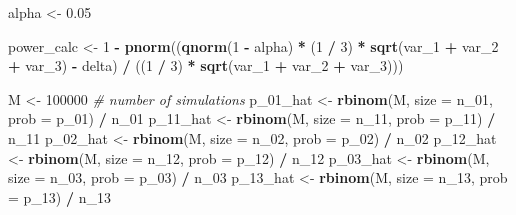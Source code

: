 \documentclass[
]{article}
\newenvironment{Shaded}{\begin{snugshade}}{\end{snugshade}}
\newcommand{\CommentTok}[1]{\textcolor[rgb]{0.56,0.35,0.01}{\textit{#1}}}
\newcommand{\DataTypeTok}[1]{\textcolor[rgb]{0.13,0.29,0.53}{#1}}
\newcommand{\DecValTok}[1]{\textcolor[rgb]{0.00,0.00,0.81}{#1}}
\newcommand{\FloatTok}[1]{\textcolor[rgb]{0.00,0.00,0.81}{#1}}
\newcommand{\KeywordTok}[1]{\textcolor[rgb]{0.13,0.29,0.53}{\textbf{#1}}}
\newcommand{\NormalTok}[1]{#1}
\newcommand{\OperatorTok}[1]{\textcolor[rgb]{0.81,0.36,0.00}{\textbf{#1}}}
\newcommand{\StringTok}[1]{\textcolor[rgb]{0.31,0.60,0.02}{#1}}
\begin{document}
\begin{Shaded}
\begin{Highlighting}[]
\NormalTok{alpha <-}\StringTok{ }\FloatTok{0.05}

\NormalTok{power_calc <-}\StringTok{ }\DecValTok{1} \OperatorTok{-}
\StringTok{  }\KeywordTok{pnorm}\NormalTok{((}\KeywordTok{qnorm}\NormalTok{(}\DecValTok{1} \OperatorTok{-}\StringTok{ }\NormalTok{alpha) }\OperatorTok{*}\StringTok{ }\NormalTok{(}\DecValTok{1} \OperatorTok{/}\StringTok{ }\DecValTok{3}\NormalTok{) }\OperatorTok{*}\StringTok{ }\KeywordTok{sqrt}\NormalTok{(var_}\DecValTok{1} \OperatorTok{+}\StringTok{ }\NormalTok{var_}\DecValTok{2} \OperatorTok{+}\StringTok{ }\NormalTok{var_}\DecValTok{3}\NormalTok{) }\OperatorTok{-}\StringTok{ }\NormalTok{delta) }\OperatorTok{/}
\StringTok{    }\NormalTok{((}\DecValTok{1} \OperatorTok{/}\StringTok{ }\DecValTok{3}\NormalTok{) }\OperatorTok{*}\StringTok{ }\KeywordTok{sqrt}\NormalTok{(var_}\DecValTok{1} \OperatorTok{+}\StringTok{ }\NormalTok{var_}\DecValTok{2} \OperatorTok{+}\StringTok{ }\NormalTok{var_}\DecValTok{3}\NormalTok{)))}

\NormalTok{M <-}\StringTok{ }\DecValTok{100000} \CommentTok{# number of simulations}
\NormalTok{p_}\DecValTok{01}\NormalTok{_hat <-}\StringTok{ }\KeywordTok{rbinom}\NormalTok{(M, }\DataTypeTok{size =}\NormalTok{ n_}\DecValTok{01}\NormalTok{, }\DataTypeTok{prob =}\NormalTok{ p_}\DecValTok{01}\NormalTok{) }\OperatorTok{/}\StringTok{ }\NormalTok{n_}\DecValTok{01}
\NormalTok{p_}\DecValTok{11}\NormalTok{_hat <-}\StringTok{ }\KeywordTok{rbinom}\NormalTok{(M, }\DataTypeTok{size =}\NormalTok{ n_}\DecValTok{11}\NormalTok{, }\DataTypeTok{prob =}\NormalTok{ p_}\DecValTok{11}\NormalTok{) }\OperatorTok{/}\StringTok{ }\NormalTok{n_}\DecValTok{11}
\NormalTok{p_}\DecValTok{02}\NormalTok{_hat <-}\StringTok{ }\KeywordTok{rbinom}\NormalTok{(M, }\DataTypeTok{size =}\NormalTok{ n_}\DecValTok{02}\NormalTok{, }\DataTypeTok{prob =}\NormalTok{ p_}\DecValTok{02}\NormalTok{) }\OperatorTok{/}\StringTok{ }\NormalTok{n_}\DecValTok{02}
\NormalTok{p_}\DecValTok{12}\NormalTok{_hat <-}\StringTok{ }\KeywordTok{rbinom}\NormalTok{(M, }\DataTypeTok{size =}\NormalTok{ n_}\DecValTok{12}\NormalTok{, }\DataTypeTok{prob =}\NormalTok{ p_}\DecValTok{12}\NormalTok{) }\OperatorTok{/}\StringTok{ }\NormalTok{n_}\DecValTok{12}
\NormalTok{p_}\DecValTok{03}\NormalTok{_hat <-}\StringTok{ }\KeywordTok{rbinom}\NormalTok{(M, }\DataTypeTok{size =}\NormalTok{ n_}\DecValTok{03}\NormalTok{, }\DataTypeTok{prob =}\NormalTok{ p_}\DecValTok{03}\NormalTok{) }\OperatorTok{/}\StringTok{ }\NormalTok{n_}\DecValTok{03}
\NormalTok{p_}\DecValTok{13}\NormalTok{_hat <-}\StringTok{ }\KeywordTok{rbinom}\NormalTok{(M, }\DataTypeTok{size =}\NormalTok{ n_}\DecValTok{13}\NormalTok{, }\DataTypeTok{prob =}\NormalTok{ p_}\DecValTok{13}\NormalTok{) }\OperatorTok{/}\StringTok{ }\NormalTok{n_}\DecValTok{13}


\end{Highlighting}
\end{Shaded}
\end{document}
